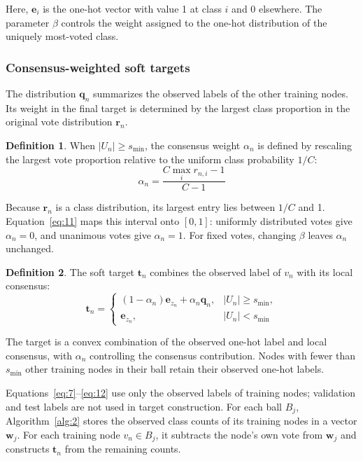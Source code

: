 \documentclass[10pt,letterpaper,nopreprintline]{elsarticle}
\theoremstyle{definition}
\newtheorem{definition}{Definition}
\theoremstyle{plain}
\begin{document}
Here, \(\mathbf e_i\) is the one-hot vector with value 1 at class \(i\) and 0 elsewhere. The parameter \(\beta\) controls the weight assigned to the one-hot distribution of the uniquely most-voted class.

\subsubsection{Consensus-weighted soft targets}\label{sec:3.3.2}

The distribution \(\mathbf q_n\) summarizes the observed labels of the other training nodes. Its weight in the final target is determined by the largest class proportion in the original vote distribution \(\mathbf r_n\).

\begin{definition}
When \(|U_n|\geq s_{\min}\), the consensus weight \(\alpha_n\) is defined by rescaling the largest vote proportion relative to the uniform class probability \(1/C\):
\begin{equation}\label{eq:11}
\alpha_n=\frac{C\max_i r_{n,i}-1}{C-1}
\end{equation}
\end{definition}

Because \(\mathbf r_n\) is a class distribution, its largest entry lies between \(1/C\) and 1. Equation~\eqref{eq:11} maps this interval onto \([0,1]\): uniformly distributed votes give \(\alpha_n=0\), and unanimous votes give \(\alpha_n=1\). For fixed votes, changing \(\beta\) leaves \(\alpha_n\) unchanged.

\Needspace{64pt}
\begin{definition}
The soft target \(\mathbf t_n\) combines the observed label of \(v_n\) with its local consensus:
\begin{equation}\label{eq:12}
\mathbf t_n=
\begin{cases}
(1-\alpha_n)\mathbf e_{z_n}+\alpha_n\mathbf q_n,&|U_n|\geq s_{\min},\\
\mathbf e_{z_n},&|U_n|<s_{\min}
\end{cases}
\end{equation}
\end{definition}

The target is a convex combination of the observed one-hot label and local consensus, with \(\alpha_n\) controlling the consensus contribution. Nodes with fewer than \(s_{\min}\) other training nodes in their ball retain their observed one-hot labels.

Equations~\eqref{eq:7}--\eqref{eq:12} use only the observed labels of training nodes; validation and test labels are not used in target construction. For each ball \(B_j\), Algorithm~\ref{alg:2} stores the observed class counts of its training nodes in a vector \(\mathbf w_j\). For each training node \(v_n\in B_j\), it subtracts the node's own vote from \(\mathbf w_j\) and constructs \(\mathbf t_n\) from the remaining counts.
\end{document}
